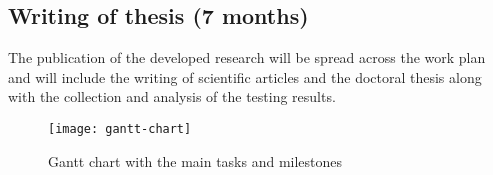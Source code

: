 \subsection{Writing of thesis (7 months)}

The publication of the developed research will be spread across the work plan and will include the writing of scientific articles and the doctoral thesis along with the collection and analysis of the testing results.



\begin{figure}[H]
	\centering
	\texttt{[image: gantt-chart]}
	\caption{Gantt chart with the main tasks and milestones}
	\label{fig:gantt-chart}
\end{figure}

